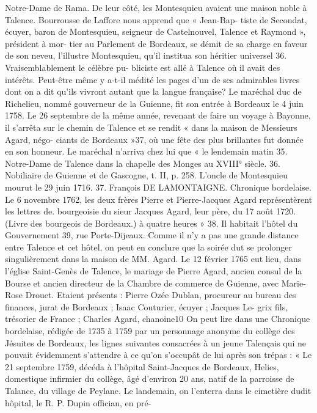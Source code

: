 \documentclass[a4paper,11pt]{book}
\begin{document}
Notre-Dame de Rama.
De leur côté, les Montesquieu avaient une maison noble
à Talence.
Bourrousse de Laffore nous apprend que « Jean-Bap-
tiste de Secondat, écuyer, baron de Montesquieu, seigneur
de Castelnouvel, Talence et Raymond », président à mor-
tier au Parlement de Bordeaux, se démit de sa charge en
faveur de son neveu, l'illustre Montesquieu, qu'il institua
son héritier universel 36. Vraisemblablement le célèbre pu-
bliciste est allé à Talence où il avait des intérêts. Peut-être
même y a-t-il médité les pages d'un de ses admirables livres
dont on a dit qu'ils vivront autant que la langue française?
Le maréchal duc de Richelieu, nommé gouverneur de
la Guienne, fit son entrée à Bordeaux le 4 juin 1758. Le
26 septembre de la même année, revenant de faire un
voyage à Bayonne, il s'arrêta sur le chemin de Talence
et se rendit « dans la maison de Messieurs Agard, négo-
ciants de Bordeaux »37, où une fête des plus brillantes
fut donnée en son honneur.
Le maréchal n'arriva chez lui que « le lendemain matin
35. Notre-Dame de Talence dans la chapelle des Monges au XVIII°
siècle.
36. Nobiliaire de Guienne et de Gascogne, t. II, p. 258.
L'oncle de Montesquieu mourut le 29 juin 1716.
37. François DE LAMONTAIGNE. Chronique bordelaise.
Le 6 novembre 1762, les deux frères Pierre et Pierre-Jacques Agard
représentèrent les lettres de. bourgeoisie du sieur Jacques Agard, leur
père, du 17 août 1720. (Livre des bourgeois de Bordeaux.)
à quatre heures » 38. Il habitait l'hôtel du Gouvernement 39,
rue Porte-Dijeaux. Comme il n'y a pas une grande distance
entre Talence et cet hôtel, on peut en conclure que la
soirée dut se prolonger singulièrement dans la maison de
MM. Agard.
Le 12 février 1765 eut lieu, dans l'église Saint-Genès de
Talence, le mariage de Pierre Agard, ancien consul de
la Bourse et ancien directeur de la Chambre de commerce
de Guienne, avec Marie-Rose Drouet. Etaient présents :
Pierre Ozée Dublan, procureur au bureau des finances,
jurat de Bordeaux ; Isaac Couturier, écuyer ; Jacques Le-
grix fils, trésorier de France ; Charles Agard, chanoine10
On peut lire dans une Chronique bordelaise, rédigée de
1735 à 1759 par un personnage anonyme du collège des
Jésuites de Bordeaux, les lignes suivantes consacrées à
un jeune Talençais qui ne pouvait évidemment s'attendre
à ce qu'on s'occupât de lui après son trépas :
« Le 21 septembre 1759, décéda à l'hôpital Saint-Jacques
de Bordeaux, Helies, domestique infirmier du collège,
âgé d'environ 20 ans, natif de la parroisse de Talance, du
village de Peylane. Le landemain, on l'enterra dans le
cimetière dudit hôpital, le R. P. Dupin offician, en pré-
\end{document}
